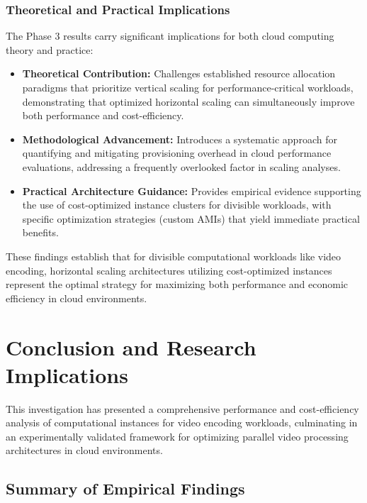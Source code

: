 \documentclass[conference]{IEEEtran}
\begin{document}
	\subsubsection{Theoretical and Practical Implications}
	
	The Phase 3 results carry significant implications for both cloud computing theory and practice:
	
	\begin{itemize}
		\item \textbf{Theoretical Contribution:} Challenges established resource allocation paradigms that prioritize vertical scaling for performance-critical workloads, demonstrating that optimized horizontal scaling can simultaneously improve both performance and cost-efficiency.
		
		\item \textbf{Methodological Advancement:} Introduces a systematic approach for quantifying and mitigating provisioning overhead in cloud performance evaluations, addressing a frequently overlooked factor in scaling analyses.
		
		\item \textbf{Practical Architecture Guidance:} Provides empirical evidence supporting the use of cost-optimized instance clusters for divisible workloads, with specific optimization strategies (custom AMIs) that yield immediate practical benefits.
	\end{itemize}
	
	These findings establish that for divisible computational workloads like video encoding, horizontal scaling architectures utilizing cost-optimized instances represent the optimal strategy for maximizing both performance and economic efficiency in cloud environments.
	
	\section{Conclusion and Research Implications}
	\label{conclusion}
	
	This investigation has presented a comprehensive performance and cost-efficiency analysis of computational instances for video encoding workloads, culminating in an experimentally validated framework for optimizing parallel video processing architectures in cloud environments.
	
	\subsection{Summary of Empirical Findings}
	
\end{document}
